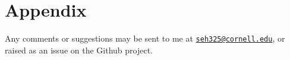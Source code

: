 \onehalfspacing
\appendix
\setcounter{table}{0}
\renewcommand{\thetable}{A\arabic{table}}
\setcounter{figure}{0}
\renewcommand{\thefigure}{A\arabic{figure}}

\section{Appendix}
\label{appendix}
Any comments or suggestions may be sent to me at \href{mailto:seh325@cornell.edu}{\nolinkurl{seh325@cornell.edu}}, or raised as an issue on the Github project.

